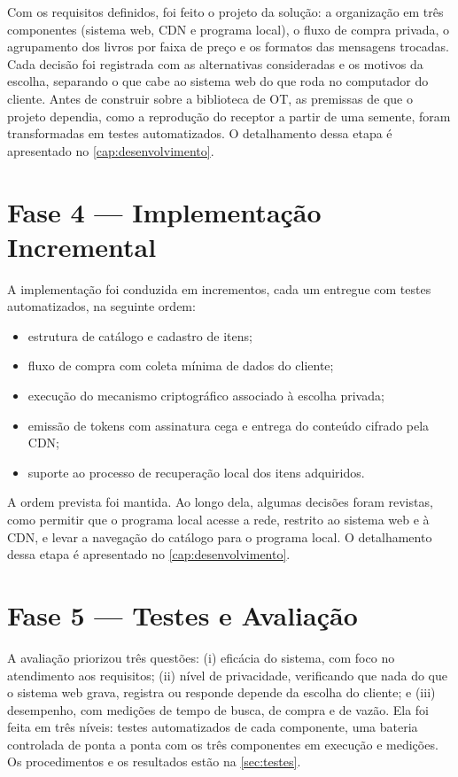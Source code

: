 Com os requisitos definidos, foi feito o projeto da solução: a organização em
três componentes (sistema web, CDN e programa local), o fluxo de compra
privada, o agrupamento dos livros por faixa de preço e os formatos das
mensagens trocadas. Cada decisão foi registrada com as alternativas
consideradas e os motivos da escolha, separando o que cabe ao sistema web do
que roda no computador do cliente. Antes de construir sobre a biblioteca de OT,
as premissas de que o projeto dependia, como a reprodução do receptor a partir
de uma semente, foram transformadas em testes automatizados. O detalhamento
dessa etapa é apresentado no \autoref{cap:desenvolvimento}.

\section{Fase 4 --- Implementação Incremental}

A implementação foi conduzida em incrementos, cada um entregue com testes
automatizados, na seguinte ordem:

\begin{itemize}
\item estrutura de catálogo e cadastro de itens;
\item fluxo de compra com coleta mínima de dados do cliente;
\item execução do mecanismo criptográfico associado à escolha privada;
\item emissão de tokens com assinatura cega e entrega do conteúdo cifrado pela
CDN;
\item suporte ao processo de recuperação local dos itens adquiridos.
\end{itemize}

A ordem prevista foi mantida. Ao longo dela, algumas decisões foram revistas,
como permitir que o programa local acesse a rede, restrito ao sistema web e à
CDN, e levar a navegação do catálogo para o programa local. O detalhamento
dessa etapa é apresentado no \autoref{cap:desenvolvimento}.

\section{Fase 5 --- Testes e Avaliação}

A avaliação priorizou três questões: (i) eficácia do sistema, com foco no
atendimento aos requisitos; (ii) nível de privacidade, verificando que nada do
que o sistema web grava, registra ou responde depende da escolha do cliente; e
(iii) desempenho, com medições de tempo de busca, de compra e de vazão. Ela foi
feita em três níveis: testes automatizados de cada componente, uma bateria
controlada de ponta a ponta com os três componentes em execução e medições.
Os procedimentos e os resultados estão na \autoref{sec:testes}.

